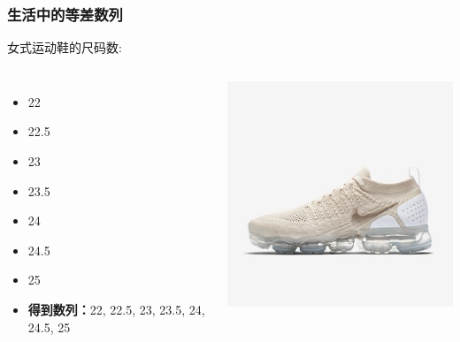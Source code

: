 \documentclass[12pt]{beamer}
\begin{document}
	\begin{frame}[fragile]\frametitle{生活中的等差数列}

		女式运动鞋的尺码数:    
		\begin{columns}
				\begin{itemize}[<+- | +->]
					\item 22
					\item 22.5
					\item 23
					\item 23.5
					\item 24
					\item 24.5
					\item 25
					\item \textbf{得到数列：}22, 22.5, 23, 23.5, 24, 24.5, 25
				\end{itemize}
				\includegraphics[width=\textwidth]{ap3.jpg}
		\end{columns}

	\end{frame}
\end{document}
